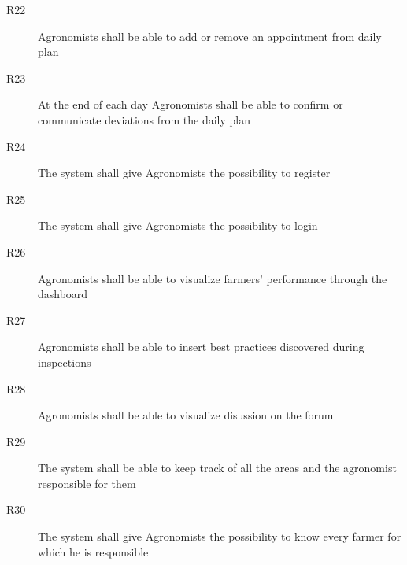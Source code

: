 \begin{description}
\begin{description}
            \item[R22] Agronomists shall be able to add or remove an appointment from daily plan
            \item[R23] At the end of each day Agronomists shall be able to confirm or communicate deviations from the daily plan
            \item[R24] The system shall give Agronomists the possibility to register
            \item[R25] The system shall give Agronomists the possibility to login
            \item[R26] Agronomists shall be able to visualize farmers' performance through the dashboard
            \item[R27] Agronomists shall be able to insert best practices discovered during inspections
            \item[R28] Agronomists shall be able to visualize disussion on the forum
            \item[R29] The system shall be able to keep track of all the areas and the agronomist responsible for them
            \item[R30] The system shall give Agronomists the possibility to know every farmer for which he is responsible 

 
 

\end{description}
\end{description}
